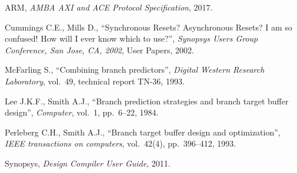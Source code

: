 \begin{thebibliography}{99}
    ARM, 
    \textit{AMBA AXI and ACE Protocol Specification},
    2017.

    Cummings C.E., Mills D.,
    ``Synchronous Resets? Asynchronous Resets? I am so confused! How will I ever know which to use?'',  
    \textit{Synopsys Users Group Conference, San Jose, CA, 2002},
    User Papers, 
    2002.

    McFarling S.,
    ``Combining branch predictors'',  
    \textit{Digital Western Research Laboratory},
    vol.~49, technical report TN-36, 
    1993.

    Lee J.K.F., Smith A.J.,
    ``Branch prediction strategies and branch target buffer design'',  
    \textit{Computer},
    vol.~1, pp.~6--22, 
    1984.

    Perleberg C.H., Smith A.J.,
    ``Branch target buffer design and optimization'',  
    \textit{IEEE transactions on computers},
    vol.~42(4), pp.~396--412, 
    1993.

    Synopsys, 
    \textit{Design Compiler User Guide},
    2011.

\end{thebibliography}